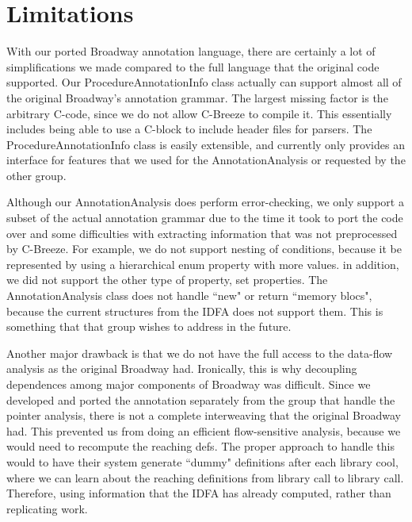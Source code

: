 \chapter{Limitations}\label{sec:limitation}
With our ported Broadway annotation language, there are certainly a lot of simplifications we made compared to the full language that the original code supported. Our ProcedureAnnotationInfo class actually can support almost all of the original Broadway's annotation grammar. The largest missing factor is the arbitrary C-code, since we do not allow C-Breeze to compile it. This essentially includes being able to use a C-block to include header files for parsers. The ProcedureAnnotationInfo class is easily extensible, and currently only provides an interface for features that we used for the AnnotationAnalysis or requested by the other group. 

Although our AnnotationAnalysis does perform error-checking, we only support a subset of the actual annotation grammar due to the time it took to port the code over and some difficulties with extracting information that was not preprocessed by C-Breeze. For example, we do not support nesting of conditions, because it be represented by using a hierarchical enum property with more values. in addition, we did not support the other type of property, set properties. The AnnotationAnalysis class does not handle ``new" or return ``memory blocs", because the current structures from the IDFA does not support them. This is something that that group wishes to address in the future.

Another major drawback is that we do not have the full access to the data-flow analysis as the original Broadway had.  Ironically, this is why decoupling dependences among major components of Broadway was difficult. Since we developed and ported the annotation separately from the group that handle the pointer analysis, there is not a complete interweaving that the original Broadway had. This prevented us from doing an efficient flow-sensitive analysis, because we would need to recompute the reaching defs. The proper approach to handle this would to have their system generate ``dummy" definitions after each library cool, where we can learn about the reaching definitions from library call to library call. Therefore, using information that the IDFA has already computed, rather than replicating work.

